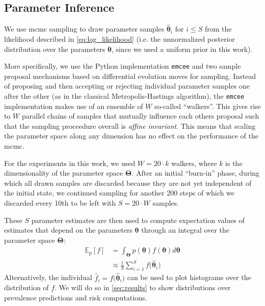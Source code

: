 \documentclass[twocolumn]{aastex631}
\begin{document}
\subsection{Parameter Inference}
\label{subsec:formalism:inference}

We use \gls{mcmc} sampling to draw parameter samples $\boldsymbol{\hat{\theta}}_i$ for $i \leq S$ from the likelihood described in \cref{eq:log_likelihood} (i.e. the unnormalized posterior distribution over the parameters $\boldsymbol{\theta}$, since we used a uniform prior in this work).

More specifically, we use the Python implementation \texttt{emcee} \cite{foreman-mackey_emcee_2013} and two sample proposal mechanisms based on differential evolution moves \cite{ter_braak_differential_2008,nelson_run_2013} for sampling. Instead of proposing and then accepting or rejecting individual parameter samples one after the other (as in the classical Metropolis-Hastings algorithm), the \texttt{emcee} implementation makes use of an ensemble of $W$ so-called ``walkers''. This gives rise to $W$ parallel chains of samples that mutually influence each others proposal such that the sampling proceedure overall is \emph{affine invariant}. This means that scaling the parameter space along any dimension has no effect on the performance of the \gls{mcmc}.

For the experiments in this work, we used $W = 20 \cdot k$ walkers, where $k$ is the dimensionality of the parameter space $\boldsymbol{\Theta}$. After an initial ``burn-in'' phase, during which all drawn samples are discarded because they are not yet independent of the initial state, we continued sampling for another 200 steps of which we discarded every 10th to be left with $S = 20 \cdot W$ samples.

These $S$ parameter estimates are then used to compute expectation values of estimates that depend on the parameters $\boldsymbol{\theta}$ through an integral over the parameter space $\boldsymbol{\Theta}$:
%
\begin{equation}
    \begin{aligned}
        \mathbb{E}_p \left[ f \right] &= \int_{\boldsymbol{\Theta}} p(\boldsymbol{\theta}) f(\boldsymbol{\theta}) d\boldsymbol{\theta} \\
        &\approx \frac{1}{S} \sum_{i=1}^S f \big( \boldsymbol{\hat{\theta}}_i \big)
    \end{aligned}
\end{equation}
%
Alternatively, the individual $\hat{f}_i = f\big( \boldsymbol{\hat{\theta}}_i \big)$ can be used to plot histograms over the distribution of $f$. We will do so in \cref{sec:results} to show distributions over prevalence predictions and risk computations.
\end{document}
